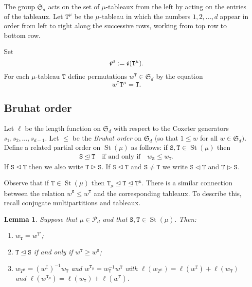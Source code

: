 \documentclass[twoside,11pt,reqno,letter]{amsart}
\numberwithin{equation}{section}
\newtheorem{Lemma}[equation]{Lemma}
\theoremstyle{definition}  %
\DeclareMathOperator\ldom {\triangleleft}
\DeclareMathOperator\ledom{\trianglelefteq}
\DeclareMathOperator\gdom {\triangleright}
\DeclareMathOperator\gedom{\trianglerighteq}
\def\bi{\text{\boldmath$i$}}
\newcommand{\St}{\operatorname{St}}
\newcommand{\Stab}{\operatorname{Stab}}
\newcommand{\0}{{\bar 0}}
\newcommand{\1}{{\bar 1}}
\def\Si{\mathfrak{S}}
\newcommand\Par{\mathscr P}
\def\T{{\mathtt T}}
\def\Stab{{\mathtt S}}
\begin{document}
The group $\Si_d$ acts on the set of $\mu$-tableaux from the left by acting on the entries of the tableaux.
Let $\T^\mu$ be the $\mu$-tableau in which the numbers $1,2,\dots,d$ appear in order from left to right along the successive rows,
working from top row to bottom row.

Set 
\begin{equation}\label{EBIMu}
\bi^\mu:=\bi(\T^\mu).
\end{equation} 
For each $\mu$-tableau $\T$ define permutations $w^\T \in \Si_d$ by the equation
\begin{equation}\label{EWT}
w^\T  \T^\mu=\T.
\end{equation}


\iffalse
\subsection{Bruhat order}
Let $\ell$ be the length function on $\Si_d$ with respect to the Coxeter generators
$s_1,s_2,\dots,s_{d-1}$. Let $\le$ be the {\em Bruhat order} on $\Si_d$ (so that $1\le w$ for all
$w\in\Si_d)$. Define a related
partial order on $\St(\mu)$ as follows: if $\Stab,\T\in\St(\mu)$ then
\begin{align}\label{EBruhat}
\Stab\ledom\T\quad\text{if and only if}\quad w_\Stab\le w_\T.
\end{align}
If $\Stab\ledom\T$ then we also write $\T\gedom\Stab$. If $\Stab\ledom\T$ and $\Stab\ne\T$ we write $\Stab\ldom\T$ and $\T\gdom\Stab$.

Observe that if  $\T\in\St(\mu)$ then $\T_\mu\ledom\T\ledom\T^\mu$. There is a similar connection between the 
relation $w^\Stab\le w^\T$ and the corresponding tableaux. To describe this,   recall conjugate multipartitions and
tableaux.


\begin{Lemma}\label{eBruhat}
  Suppose that $\mu\in\Par_d$ and that $\Stab,\T\in\St(\mu)$. Then:
  \begin{enumerate}
    \item $w_\T=w^{\T'}$;
    \item $\T\ledom\Stab$ if and only if $w^\T\ge w^\Stab$;
    \item $w_{T^\mu}=(w^\T)^{-1}w_\T$ and $w^{\T_\mu}=w_\T^{-1}w^\T$ with
      $\ell(w_{T^\mu})=\ell(w^\T)+\ell(w_\T)$ and $\ell(w^{\T_\mu})=\ell(w_\T)+\ell(w^\T)$.
  \end{enumerate}
\end{Lemma}
\end{document}
